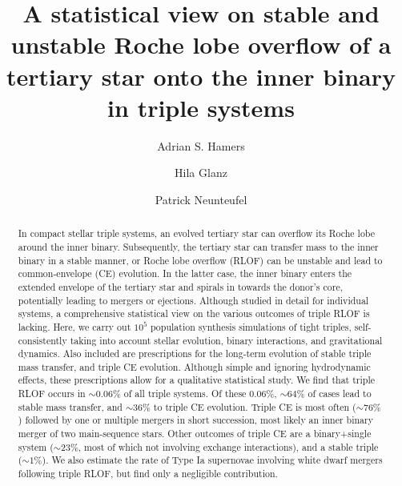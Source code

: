 \documentclass[twocolumn,appendixfloats,tighten]{aastex631}
\begin{document}
\title{A statistical view on stable and unstable Roche lobe overflow of a tertiary star onto the inner binary in triple systems} 


\author[0000-0003-1004-5635]{Adrian S. Hamers}

\author[0000-0002-6012-2136]{Hila Glanz}

\author[0000-0001-5853-6017]{Patrick Neunteufel}



\begin{abstract} %
In compact stellar triple systems, an evolved tertiary star can overflow its Roche lobe around the inner binary. Subsequently, the tertiary star can transfer mass to the inner binary in a stable manner, or Roche lobe overflow (RLOF) can be unstable and lead to common-envelope (CE) evolution. In the latter case, the inner binary enters the extended envelope of the tertiary star and spirals in towards the donor's core, potentially leading to mergers or ejections. Although studied in detail for individual systems, a comprehensive statistical view on the various outcomes of triple RLOF is lacking. Here, we carry out $10^5$ population synthesis simulations of tight triples, self-consistently taking into account stellar evolution, binary interactions, and gravitational dynamics. Also included are prescriptions for the long-term evolution of stable triple mass transfer, and triple CE evolution. Although simple and ignoring hydrodynamic effects, these prescriptions allow for a qualitative statistical study. We find that triple RLOF occurs in $\sim 0.06\%$ of all triple systems. Of these 0.06\%, $\sim 64\%$ of cases lead to stable mass transfer, and $\sim 36\%$ to triple CE evolution. Triple CE is most often ($\sim 76\%$) followed by one or multiple mergers in short succession, most likely an inner binary merger of two main-sequence stars. Other outcomes of triple CE are a binary+single system ($\sim 23\%$, most of which not involving exchange interactions), and a stable triple ($\sim 1\%$). We also estimate the rate of Type Ia supernovae involving white dwarf mergers following triple RLOF, but find only a negligible contribution. 
\end{abstract}
\end{document}
